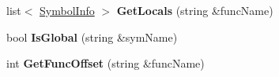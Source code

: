 \begin{DoxyCompactItemize}
\item 
\hypertarget{classSymTab_a76b5a70170535019b1fe58fa25a9998c}{list$<$ \hyperlink{structSymbolInfo}{Symbol\-Info} $>$ {\bfseries Get\-Locals} (string \&func\-Name)}\label{classSymTab_a76b5a70170535019b1fe58fa25a9998c}

\item 
\hypertarget{classSymTab_a4c4699d90ffd605b205e9e94be9eacde}{bool {\bfseries Is\-Global} (string \&sym\-Name)}\label{classSymTab_a4c4699d90ffd605b205e9e94be9eacde}

\item 
\hypertarget{classSymTab_a793c31d247f484b04a9283e71f172756}{int {\bfseries Get\-Func\-Offset} (string \&func\-Name)}\label{classSymTab_a793c31d247f484b04a9283e71f172756}

\end{DoxyCompactItemize}
